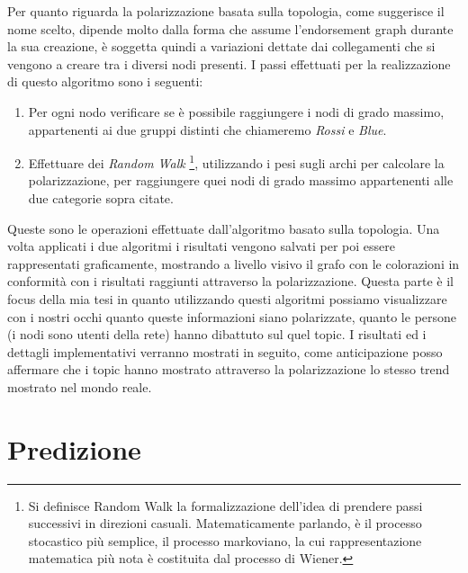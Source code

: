Per quanto riguarda la polarizzazione basata sulla topologia, come suggerisce il nome scelto, dipende molto dalla forma che assume l'endorsement graph durante la sua creazione, è soggetta quindi a variazioni dettate dai collegamenti che si vengono a creare tra i diversi nodi presenti. I passi effettuati per la realizzazione di questo algoritmo sono i seguenti:
\begin{enumerate}
\item Per ogni nodo verificare se è possibile raggiungere i nodi di grado massimo, appartenenti ai due gruppi distinti che chiameremo \textit{Rossi} e \textit{Blue}.
\item Effettuare dei \textit{Random Walk} \footnote{Si definisce Random Walk la formalizzazione dell'idea di prendere passi successivi in direzioni casuali. Matematicamente parlando, è il processo stocastico più semplice, il processo markoviano, la cui rappresentazione matematica più nota è costituita dal processo di Wiener.}, utilizzando i pesi sugli archi per calcolare la polarizzazione, per raggiungere quei nodi di grado massimo appartenenti alle due categorie sopra citate.
\end{enumerate}
Queste sono le operazioni effettuate dall'algoritmo basato sulla topologia.
Una volta applicati i due algoritmi i risultati vengono salvati per poi essere rappresentati graficamente, mostrando a livello visivo il grafo con le colorazioni in conformità con i risultati raggiunti attraverso la polarizzazione.
Questa parte è il focus della mia tesi in quanto utilizzando questi algoritmi possiamo visualizzare con i nostri occhi quanto queste informazioni siano polarizzate, quanto le persone (i nodi sono utenti della rete) hanno dibattuto sul quel topic. I risultati ed i dettagli implementativi verranno mostrati in seguito, come anticipazione posso affermare che i topic hanno mostrato attraverso la polarizzazione lo stesso trend mostrato nel mondo reale.

\section{Predizione}

